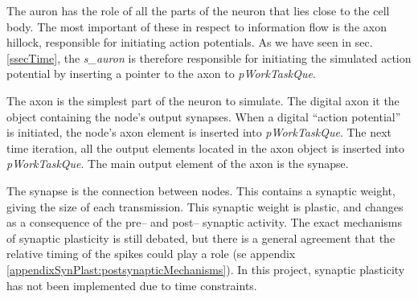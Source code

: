 		The auron has the role of all the parts of the neuron that lies close to the cell body. 
		The most important of these in respect to information flow is the axon hillock, responsible for initiating action potentials.
		As we have seen in sec. \ref{ssecTime}, the \emph{s\_auron} is therefore responsible for initiating the simulated action potential       by inserting a pointer to the axon to \emph{pWorkTaskQue}. %

		The axon is the simplest part of the neuron to simulate.
		The digital axon it the object containing the node's output synapses.
		When a digital ``action potential'' is initiated, the node's axon element is inserted into \emph{pWorkTaskQue}.
		The next time iteration, all the output elements located in the axon object is inserted into \emph{pWorkTaskQue}.
		The main output element of the axon is the synapse.

		The synapse is the connection between nodes. This contains a synaptic weight, giving the size of each transmission.
		This synaptic weight is plastic, and changes as a consequence of the pre-- and post-- synaptic activity.
		The exact mechanisms of synaptic plasticity is still debated, but there is a general agreement that the relative timing of the spikes could play a role (se appendix \ref{appendixSynPlast:postsynapticMechanisms}).
		In this project, synaptic plasticity has not been implemented due to time constraints.





